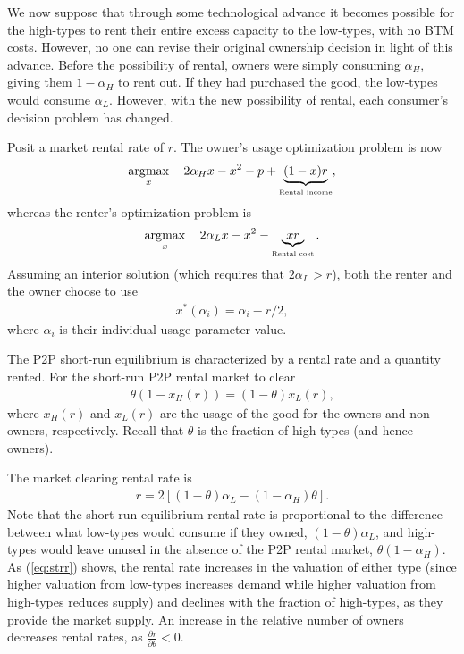\documentclass[11pt]{article}
\DeclareMathOperator*{\argmax}{\arg\!\max}
\begin{document}
We now suppose that through some technological advance it becomes possible for the high-types to rent their entire excess capacity to the low-types, with no BTM costs.
However, no one can revise their original ownership decision in light of this advance. 
Before the possibility of rental, owners were simply consuming $\alpha_H$, giving them $1-\alpha_H$ to rent out.
If they had purchased the good, the low-types would consume $\alpha_L$. 
However, with the new possibility of rental, each consumer's decision problem has changed. 

Posit a market rental rate of $r$. 
The owner's usage optimization problem is now 
\begin{align}
\argmax_x \quad 2\alpha_H x - x^2 -p + \underbrace{(1-x)r}_{\mbox{{\tiny Rental income}}},   \nonumber 
\end{align} 
whereas the renter's optimization problem is 
\begin{align}
\argmax_x \quad 2 \alpha_L x - x^2 - \underbrace{xr}_{\mbox{{\tiny Rental cost}}}.  \nonumber
\end{align} 
Assuming an interior solution (which requires that $2\alpha_L > r$), both the renter and the owner choose to use
\begin{align}
x^*(\alpha_i) = \alpha_i - r/2, 
\end{align} 
where $\alpha_i$ is their individual usage parameter value. 

The P2P short-run equilibrium is characterized by a rental rate and a quantity rented. 
For the short-run P2P rental market to clear 
\begin{align}
  \theta \left( 1 - x_H(r) \right) = (1-\theta) x_L(r),
\end{align}
where $x_H(r)$ and $x_L(r)$ are the usage of the good for the owners and non-owners, respectively.
Recall that $\theta$ is the fraction of high-types (and hence owners).

The market clearing rental rate is 
\begin{align} \label{eq:strr} 
r = 2\left[ (1-\theta)\alpha_L - (1-\alpha_H) \theta \right]. 
\end{align}
Note that the short-run equilibrium rental rate is proportional to the difference between what low-types would consume if they owned, $(1-\theta)\alpha_L$, and high-types would leave unused in the absence of the P2P rental market, $\theta (1-\alpha_H)$. 
As (\ref{eq:strr}) shows, the rental rate increases in the valuation of either type (since higher valuation from low-types increases demand while higher valuation from high-types reduces supply) and declines with the fraction of high-types, as they provide the market supply. 
An increase in the relative number of owners decreases rental rates, as $\frac{\partial r}{\partial \theta} < 0$. 
\end{document}
